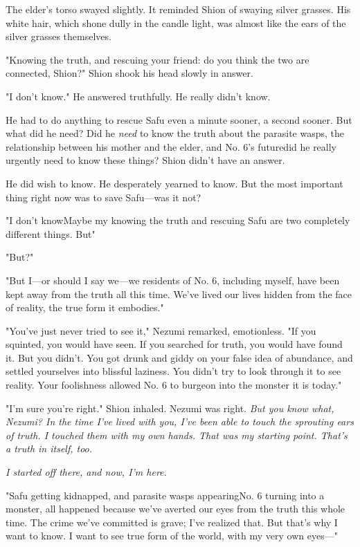 The elder's torso swayed slightly. It reminded Shion of swaying silver
grasses. His white hair, which shone dully in the candle light, was
almost like the ears of the silver grasses themselves.

"Knowing the truth, and rescuing your friend: do you think the two are
connected, Shion?" Shion shook his head slowly in answer.

"I don't know." He answered truthfully. He really didn't know.

He had to do anything to rescue Safu even a minute sooner, a second
sooner. But what did he need? Did he \emph{need} to know the truth about the
parasite wasps, the relationship between his mother and the elder, and
No. 6's future\el did he really urgently need to know these things?
Shion didn't have an answer.

He did wish to know. He desperately yearned to know. But the most
important thing right now was to save Safu---was it not?

"I don't know\el Maybe my knowing the truth and rescuing Safu are two
completely different things. But\el "

"But?"

"But I---or should I say we---we residents of No. 6, including myself, have
been kept away from the truth all this time. We've lived our lives
hidden from the face of reality, the true form it embodies."

"You've just never tried to see it," Nezumi remarked, emotionless. "If
you squinted, you would have seen. If you searched for truth, you would
have found it. But you didn't. You got drunk and giddy on your false
idea of abundance, and settled yourselves into blissful laziness. You
didn't try to look through it to see reality. Your foolishness allowed
No. 6 to burgeon into the monster it is today."

"I'm sure you're right." Shion inhaled. Nezumi was right. \emph{But you know
what, Nezumi? In the time I've lived with you, I've been able to touch
the sprouting ears of truth. I touched them with my own hands. That was
my starting point. That's a truth in itself, too.}

\emph{I started off there, and now, I'm here.}

"Safu getting kidnapped, and parasite wasps appearing\el No. 6 turning
into a monster, all happened because we've averted our eyes from the
truth this whole time. The crime we've committed is grave; I've realized
that. But that's why I want to know. I want to see true form of the
world, with my very own eyes---"

